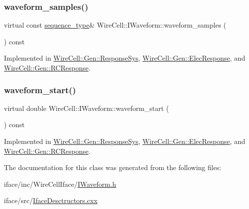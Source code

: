 \mbox{\label{class_wire_cell_1_1_i_waveform_a4901f7f36170f22c3e89ebd7939be4d0}} 
\subsubsection{\texorpdfstring{waveform\+\_\+samples()}{waveform\_samples()}}
{\footnotesize\ttfamily virtual const \hyperlink{class_wire_cell_1_1_i_waveform_ad8f85e800ab8082ddbd89ac91164db7d}{sequence\+\_\+type}\& Wire\+Cell\+::\+I\+Waveform\+::waveform\+\_\+samples (\begin{DoxyParamCaption}{ }\end{DoxyParamCaption}) const\hspace{0.3cm}{\ttfamily [pure virtual]}}



Implemented in \hyperlink{class_wire_cell_1_1_gen_1_1_response_sys_acfe9c4ac7194cd013c12168df9021005}{Wire\+Cell\+::\+Gen\+::\+Response\+Sys}, \hyperlink{class_wire_cell_1_1_gen_1_1_elec_response_a78f88dda994c96afaf9b7d82044a46a7}{Wire\+Cell\+::\+Gen\+::\+Elec\+Response}, and \hyperlink{class_wire_cell_1_1_gen_1_1_r_c_response_ac51bbb2238729a224d49dc513b02a16e}{Wire\+Cell\+::\+Gen\+::\+R\+C\+Response}.

\mbox{\label{class_wire_cell_1_1_i_waveform_ac7dfdf92e835bf708838bcdc1ba91ba2}} 
\subsubsection{\texorpdfstring{waveform\+\_\+start()}{waveform\_start()}}
{\footnotesize\ttfamily virtual double Wire\+Cell\+::\+I\+Waveform\+::waveform\+\_\+start (\begin{DoxyParamCaption}{ }\end{DoxyParamCaption}) const\hspace{0.3cm}{\ttfamily [pure virtual]}}



Implemented in \hyperlink{class_wire_cell_1_1_gen_1_1_response_sys_a7b431ba8fb1668bd0b067f5f03b53171}{Wire\+Cell\+::\+Gen\+::\+Response\+Sys}, \hyperlink{class_wire_cell_1_1_gen_1_1_elec_response_a098956b30d90fb379d538052204011f5}{Wire\+Cell\+::\+Gen\+::\+Elec\+Response}, and \hyperlink{class_wire_cell_1_1_gen_1_1_r_c_response_acbb5822df38128bb24093caf14573766}{Wire\+Cell\+::\+Gen\+::\+R\+C\+Response}.



The documentation for this class was generated from the following files\+:\begin{DoxyCompactItemize}
\item 
iface/inc/\+Wire\+Cell\+Iface/\hyperlink{_i_waveform_8h}{I\+Waveform.\+h}\item 
iface/src/\hyperlink{_iface_desctructors_8cxx}{Iface\+Desctructors.\+cxx}\end{DoxyCompactItemize}

